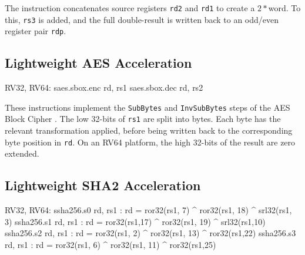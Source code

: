 The  instruction concatenates source registers
{\tt rd2} and {\tt rd1} to create a $2*$\XLEN word.
To this, {\tt rs3} is added, and the full double-\XLEN result is written
back to an odd/even register pair {\tt rdp}.



\subsection{Lightweight AES Acceleration}

\begin{isa}
RV32, RV64:
    saes.sbox.enc rd, rs1
    saes.sbox.dec rd, rs2
\end{isa}

These instructions implement the 
{\tt SubBytes} \cite[Section 5.1.1]{nist:fips:197}
and
{\tt InvSubBytes} \cite[Section 5.3.1]{nist:fips:197}
steps of the AES Block Cipher \cite{nist:fips:197}.
The low 32-bits of {\tt rs1} are split into bytes.
Each byte has the relevant transformation applied, before
being written back to the corresponding byte position in {\tt rd}.
On an RV64 platform, the high 32-bits of the result are zero
extended.





\subsection{Lightweight SHA2 Acceleration}

\begin{isa}
RV32, RV64:
    ssha256.s0 rd, rs1 : rd = ror32(rs1, 7) ^ ror32(rs1, 18) ^ srl32(rs1, 3)
    ssha256.s1 rd, rs1 : rd = ror32(rs1,17) ^ ror32(rs1, 19) ^ srl32(rs1,10)
    ssha256.s2 rd, rs1 : rd = ror32(rs1, 2) ^ ror32(rs1, 13) ^ ror32(rs1,22)
    ssha256.s3 rd, rs1 : rd = ror32(rs1, 6) ^ ror32(rs1, 11) ^ ror32(rs1,25)
\end{isa}

